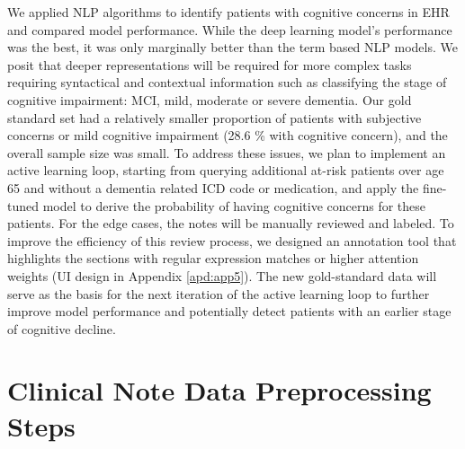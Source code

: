 \documentclass[pmlr,twocolumn]{jmlr} %
\begin{document}
We applied NLP algorithms to identify patients with cognitive concerns in EHR and compared model performance. While the deep learning model's performance was the best, it was only marginally better than the term based NLP models. We posit that deeper representations will be required for more complex tasks requiring syntactical and contextual information such as classifying the stage of cognitive impairment: MCI, mild, moderate or severe dementia. Our gold standard set had a relatively smaller proportion of patients with subjective concerns or mild cognitive impairment (28.6 \% with cognitive concern), and the overall sample size was small. To address these issues, we plan to implement an active learning loop, starting from querying additional at-risk patients over age 65 and without a dementia related ICD code or medication, and apply the fine-tuned model to derive the probability of having cognitive concerns for these patients. For the edge cases, the notes will be manually reviewed and labeled. To improve the efficiency of this review process, we designed an annotation tool that highlights the sections with regular expression matches or higher attention weights (UI design in Appendix \ref{apd:app5}). The new gold-standard data will serve as the basis for the next iteration of the active learning loop to further improve model performance and potentially detect patients with an earlier stage of cognitive decline.

\clearpage




% 

\clearpage
\appendix

\section{Clinical Note Data Preprocessing Steps}\label{apd:app6}
\end{document}
